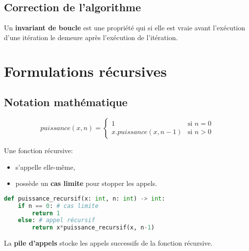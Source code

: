 \documentclass[a4paper,11pt]{article}
\begin{document}
\subsection{Correction de l'algorithme}
\begin{aretenir}[]
    Un \textbf{invariant de boucle} est une propriété qui si elle est vraie avant l’exécution d’une itération le demeure après l’exécution de l’itération.
\end{aretenir}
\section{Formulations récursives}
\subsection{Notation mathématique}
$$
    puissance(x,n) = \left\{
        \begin{array}{ll}
            1 & \mbox{si } n=0 \\
            x.puissance(x,n-1) & \mbox{si } n>0
        \end{array}
    \right.
    $$
    \begin{aretenir}[]
        Une fonction récursive:
        \begin{itemize}
            \item s'appelle elle-même,
            \item possède un \textbf{cas limite} pour stopper les appels.
        \end{itemize}
        \end{aretenir}
\begin{center}
    \begin{lstlisting}[language=Python , basicstyle=\ttfamily, xleftmargin=2em, xrightmargin=1em]
def puissance_recursif(x: int, n: int) -> int:
    if n == 0: # cas limite
        return 1
    else: # appel récursif
        return x*puissance_recursif(x, n-1)
\end{lstlisting}
    \label{CODE}
    \end{center}
    \begin{aretenir}[]
        La \textbf{pile d'appels} stocke les appels successifs de la fonction récursive.
        \end{aretenir}
\end{document}
